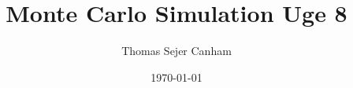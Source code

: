 \documentclass{article}
\title{Monte Carlo Simulation Uge 8}
\author{Thomas Sejer Canham}
\date{\today}
\theoremstyle{definition}
\theoremstyle{remark}
\begin{document}

\begin{titlepage}

    \maketitle
    \thispagestyle{empty}

\end{titlepage}
\end{document}
